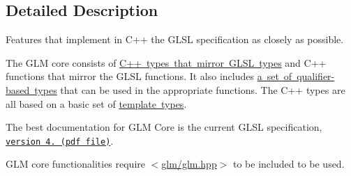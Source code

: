 \subsection{Detailed Description}
Features that implement in C++ the G\+L\+SL specification as closely as possible. 

The G\+LM core consists of \mbox{\hyperlink{group__core__types}{C++ types that mirror G\+L\+SL types}} and C++ functions that mirror the G\+L\+SL functions. It also includes \mbox{\hyperlink{group__core__precision}{a set of qualifier-\/based types}} that can be used in the appropriate functions. The C++ types are all based on a basic set of \mbox{\hyperlink{group__core__template}{template types}}.

The best documentation for G\+LM Core is the current G\+L\+SL specification, \href{http://www.opengl.org/registry/doc/GLSLangSpec.4.20.8.clean.pdf}{\tt version 4. (pdf file)}.

G\+LM core functionalities require $<$\mbox{\hyperlink{glm_8hpp}{glm/glm.\+hpp}}$>$ to be included to be used. 